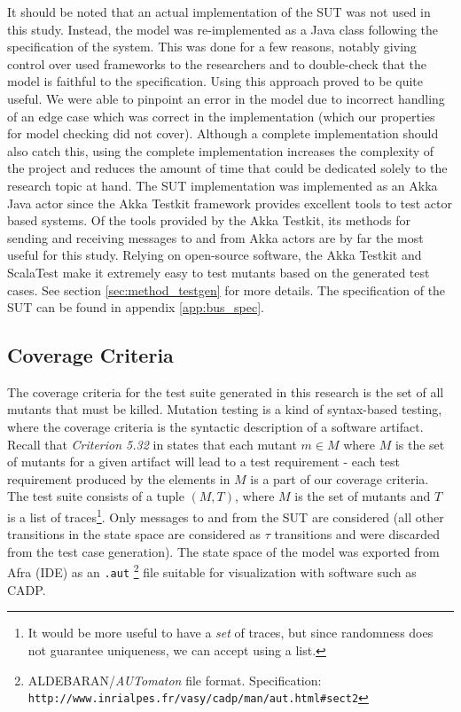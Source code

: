 \documentclass{article}
\begin{document}
			It should be noted that an actual implementation of the SUT was not used in this study. Instead, the model was re-implemented as a Java class following the specification of the system. This was done for a few reasons, notably giving control over used frameworks to the researchers and to double-check that the model is faithful to the specification. Using this approach proved to be quite useful. We were able to pinpoint an error in the model due to incorrect handling of an edge case which was correct in the implementation (which our properties for model checking did not cover). Although a complete implementation should also catch this, using the complete implementation increases the complexity of the project and reduces the amount of time that could be dedicated solely to the research topic at hand.  The SUT implementation was implemented as an Akka Java actor since the Akka Testkit framework provides excellent tools to test actor based systems. Of the tools provided by the Akka Testkit, its methods for sending and receiving messages to and from Akka actors are by far the most useful for this study. Relying on open-source software, the Akka Testkit and ScalaTest make it extremely easy to test mutants based on the generated test cases. See section \ref{sec:method_testgen} for more details. The specification of the SUT can be found in appendix \ref{app:bus_spec}.


		\subsection{Coverage Criteria}
			\label{sec:coveragecrit}
			The coverage criteria for the test suite generated in this research is the set of all mutants that must be killed. Mutation testing is a kind of syntax-based testing, where the coverage criteria is the syntactic description of a software artifact. Recall that \textit{Criterion 5.32} in \citet{ammann2008introduction} states that each mutant $m \in M$ where $M$ is the set of mutants for a given artifact will lead to a test requirement \-- each test requirement produced by the elements in $M$ is a part of our coverage criteria.
			The test suite consists of a tuple $(M, T)$, where $M$ is the set of mutants and $T$ is a list of traces\footnote{It would be more useful to have a \textit{set} of traces, but since randomness does not guarantee uniqueness, we can accept using a list.}. Only messages to and from the SUT are considered (all other transitions in the state space are considered as $\tau$ transitions and were discarded from the test case generation). The state space of the model was exported from Afra (\Rebeca IDE) as an \texttt{.aut}
			\footnote{ALDEBARAN/\textit{AUTomaton} file format. Specification: \texttt{http://www.inrialpes.fr/vasy/cadp/man/aut.html\#sect2}} file suitable for visualization with software such as CADP.
\end{document}
